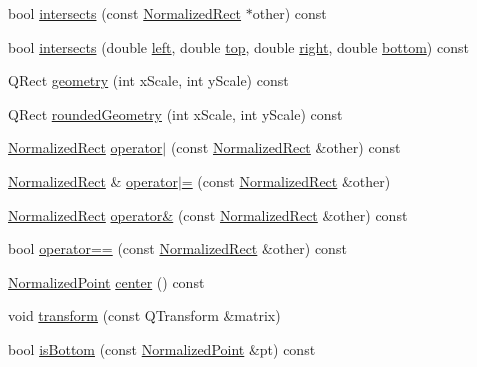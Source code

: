 \begin{DoxyCompactItemize}
\item 
bool \hyperlink{classOkular_1_1NormalizedRect_a886cdecc7922230bf6fe6b5c7ee71197}{intersects} (const \hyperlink{classOkular_1_1NormalizedRect}{Normalized\+Rect} $\ast$other) const 
\item 
bool \hyperlink{classOkular_1_1NormalizedRect_a7254f142cb6ca673fb344d2545cb23c0}{intersects} (double \hyperlink{classOkular_1_1NormalizedRect_a76336fe9d733f2b559cf8df3ef48f9e7}{left}, double \hyperlink{classOkular_1_1NormalizedRect_acfb70f6417c993508d50090b512cb954}{top}, double \hyperlink{classOkular_1_1NormalizedRect_a12bbdbb865e6282c9a325b61638553f4}{right}, double \hyperlink{classOkular_1_1NormalizedRect_a06fddfff238371f6f584360c0678741a}{bottom}) const 
\item 
Q\+Rect \hyperlink{classOkular_1_1NormalizedRect_a006897c5fcff2c3a97b4141f1a967513}{geometry} (int x\+Scale, int y\+Scale) const 
\item 
Q\+Rect \hyperlink{classOkular_1_1NormalizedRect_a0518472bc065119466fecc6cbb6486de}{rounded\+Geometry} (int x\+Scale, int y\+Scale) const 
\item 
\hyperlink{classOkular_1_1NormalizedRect}{Normalized\+Rect} \hyperlink{classOkular_1_1NormalizedRect_ab82a6bd130f6609b89ab44e8bc6b0872}{operator$\vert$} (const \hyperlink{classOkular_1_1NormalizedRect}{Normalized\+Rect} \&other) const 
\item 
\hyperlink{classOkular_1_1NormalizedRect}{Normalized\+Rect} \& \hyperlink{classOkular_1_1NormalizedRect_a6ff74d915faa4d82dda2887a6751ac29}{operator$\vert$=} (const \hyperlink{classOkular_1_1NormalizedRect}{Normalized\+Rect} \&other)
\item 
\hyperlink{classOkular_1_1NormalizedRect}{Normalized\+Rect} \hyperlink{classOkular_1_1NormalizedRect_a90389666c455ee67782d939639604d52}{operator\&} (const \hyperlink{classOkular_1_1NormalizedRect}{Normalized\+Rect} \&other) const 
\item 
bool \hyperlink{classOkular_1_1NormalizedRect_a17c80476a866fca0b6a1ff5834d304f3}{operator==} (const \hyperlink{classOkular_1_1NormalizedRect}{Normalized\+Rect} \&other) const 
\item 
\hyperlink{classOkular_1_1NormalizedPoint}{Normalized\+Point} \hyperlink{classOkular_1_1NormalizedRect_ac5c7173b01ac84afe38cd0c93b653435}{center} () const 
\item 
void \hyperlink{classOkular_1_1NormalizedRect_ae3bd6448865cb5b1f2b0fb8327d47e9b}{transform} (const Q\+Transform \&matrix)
\item 
bool \hyperlink{classOkular_1_1NormalizedRect_ad7d24b65fc3351cd6dd6eace53d6a6e5}{is\+Bottom} (const \hyperlink{classOkular_1_1NormalizedPoint}{Normalized\+Point} \&pt) const 

\end{DoxyCompactItemize}
